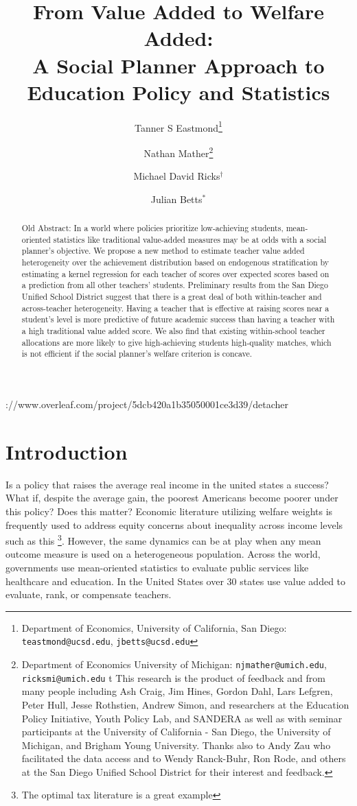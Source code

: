 \documentclass{article}
\title{From Value Added to Welfare Added: \\ A Social Planner Approach to Education Policy and Statistics}
\author{Tanner S Eastmond\thanks{Department of Economics, University of California, San Diego: \texttt{teastmond@ucsd.edu}, \texttt{jbetts@ucsd.edu}} \and Nathan Mather\thanks{Department of Economics University of Michigan: \texttt{njmather@umich.edu}, \texttt{ricksmi@umich.edu} \hspace{11em} {\color{white}t} This research is the product of feedback and from many people including Ash Craig, Jim Hines, Gordon Dahl, Lars Lefgren, Peter Hull, Jesse Rothstien,  Andrew Simon, and  researchers at the Education Policy Initiative, Youth Policy Lab, and SANDERA as well as with seminar participants at the University of California - San Diego, the University of Michigan, and Brigham Young University. Thanks also to Andy Zau who facilitated the data access and to  Wendy Ranck-Buhr, Ron Rode, and others at the San Diego Unified School District for their interest and feedback.} \and Michael David Ricks$^\dagger$ \and Julian Betts$^*$}
\date{\parbox{\linewidth}{\centering%
  This Draft Updated: \today\endgraf
  }}
\theoremstyle{definition}
\theoremstyle{definition}
\theoremstyle{definition}
\theoremstyle{definition}
\begin{document}
\maketitle

\onehalfspacing
\begin{abstract}
{\color{red}Old Abstract:} In a world where policies prioritize low-achieving students, mean-oriented statistics like traditional value-added measures may be at odds with a social planner’s objective. We propose a new method to estimate teacher value added heterogeneity over the achievement distribution based on endogenous stratification by estimating a kernel regression for each teacher of scores over expected scores based on a prediction from all other teachers’ students.  Preliminary results from the San Diego Unified School District suggest that there is a great deal of both within-teacher and across-teacher heterogeneity. Having a teacher that is effective at raising scores near a student’s level is more predictive of future academic success than having a teacher with a high traditional value added score. We also find that existing within-school teacher allocations are more likely to give high-achieving students high-quality matches, which is not efficient if the social planner’s welfare criterion is concave.


\end{abstract}


\doublespacinghttps://www.overleaf.com/project/5dcb420a1b35050001ce3d39/detacher
\vfill
\pagebreak

\section{Introduction}

    Is a policy that raises the average real income in the united states a success? What if, despite the average gain, the poorest Americans become poorer under this policy? Does this matter? Economic literature utilizing welfare weights is frequently used to address equity concerns about inequality across income levels such as this \footnote{The optimal tax literature is a great example}. However, the same dynamics can be at play when any mean outcome measure is used on a heterogeneous population.  
    Across the world, governments use mean-oriented statistics to evaluate public services like healthcare and education. In the United States over 30 states use value added to evaluate, rank, or compensate teachers. 
    
\end{document}
